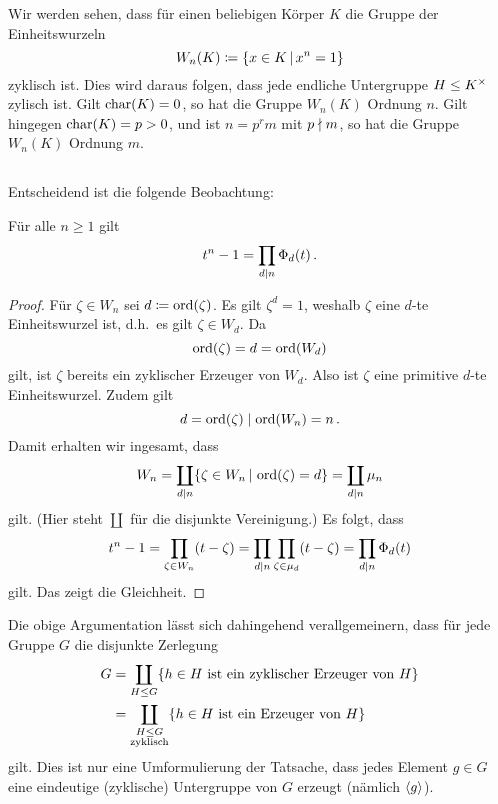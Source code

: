 \begin{remark}
  Wir werden sehen, dass für einen beliebigen Körper $K$ die Gruppe der Einheitswurzeln
  \[
              W_n(K)
    \coloneqq \{ x \in K \suchthat x^n = 1 \}
  \]
  zyklisch ist.
  Dies wird daraus folgen, dass jede endliche Untergruppe $H \leq K^\times$ zylisch ist.
  Gilt $\operatorname{char}(K) = 0$, so hat die Gruppe $W_n(K)$ Ordnung $n$.
  Gilt hingegen $\operatorname{char}(K) = p > 0$, und ist $n = p^r m$ mit $p \mathrel{\nmid} m$, so hat die Gruppe $W_n(K)$ Ordnung $m$.
\end{remark}





\subsection{}

Entscheidend ist die folgende Beobachtung:

\begin{lemma}
  \label{lemma: decomposition into cyclotomic polynomials}
  Für alle $n \geq 1$ gilt
  \[
      t^n - 1
    = \prod_{d \mathrel{|} n} \Phi_d(t) \,.
  \]
\end{lemma}

\begin{proof}
  Für $\zeta \in W_n$ sei $d \coloneqq \operatorname{ord}(\zeta)$.
  Es gilt $\zeta^d = 1$, weshalb $\zeta$ eine $d$-te Einheitswurzel ist, d.h.\ es gilt $\zeta \in W_d$.
  Da
  \[
      \operatorname{ord}(\zeta)
    = d
    = \operatorname{ord}(W_d)
  \]
  gilt, ist $\zeta$ bereits ein zyklischer Erzeuger von $W_d$.
  Also ist $\zeta$ eine primitive $d$-te Einheitswurzel.
  Zudem gilt
  \[
              d
    =         \operatorname{ord}(\zeta)
    \mathrel{|}  \operatorname{ord}(W_n)
    =         n \,.
  \]
  Damit erhalten wir ingesamt, dass
  \[
      W_n
    = \coprod_{d \divides n} \{ \zeta \in W_n \suchthat \ord{\zeta} = d \}
    = \coprod_{d \divides n} \mu_n
  \]
  gilt.
  (Hier steht $\coprod$ für die disjunkte Vereinigung.)
  Es folgt, dass
  \[
      t^n - 1
    = \prod_{\zeta \in W_n} (t - \zeta)
    = \prod_{d \mathrel{|} n} \prod_{\zeta \in \mu_d} (t - \zeta)
    = \prod_{d \mathrel{|} n} \Phi_d(t)
  \]
  gilt.
  Das zeigt die Gleichheit.
\end{proof}

\begin{remark}
  Die obige Argumentation lässt sich dahingehend verallgemeinern, dass für jede Gruppe $G$ die disjunkte Zerlegung
  \begin{align*}
        G
    &=  \coprod_{H \leq G} \{\text{$h \in H$ ist ein zyklischer Erzeuger von $H$}\}  \\
    &=  \coprod_{\substack{H \leq G \\ \text{zyklisch}}} \{\text{$h \in H$ ist ein Erzeuger von $H$}\}
  \end{align*}
  gilt.
  Dies ist nur eine Umformulierung der Tatsache, dass jedes Element $g \in G$ eine eindeutige (zyklische) Untergruppe von $G$ erzeugt (nämlich $\langle g\rangle$).
\end{remark}

